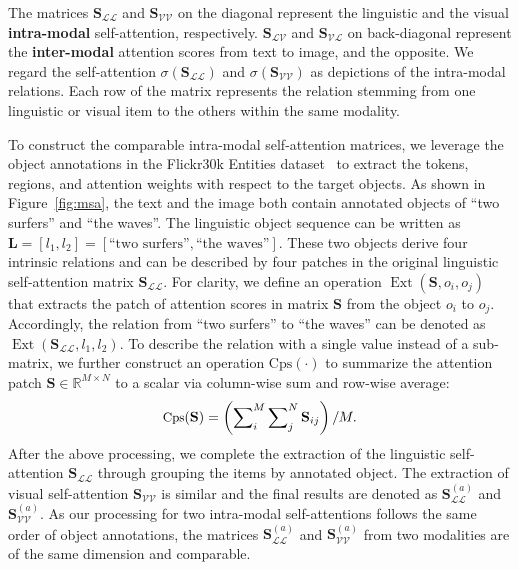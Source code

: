 \documentclass[11pt,a4paper]{article}
\begin{document}
The matrices $\mathbf{S}_{\mathcal{LL}}$ and $\mathbf{S}_{\mathcal{VV}}$ on the diagonal represent the linguistic and the visual \textbf{intra-modal} self-attention, respectively. 
$\mathbf{S}_{\mathcal{LV}}$ and $\mathbf{S}_{\mathcal{VL}}$ on back-diagonal represent the \textbf{inter-modal} attention scores from text to image, and the opposite.
We regard the self-attention $\sigma\left(\mathbf{S}_{\mathcal{LL}}\right)$ and $\sigma\left(\mathbf{S}_{\mathcal{VV}}\right)$ as depictions of the intra-modal relations. Each row of the matrix represents the relation stemming from one linguistic or visual item to the others within the same modality. 

To construct the comparable intra-modal self-attention matrices, we leverage the object annotations in the Flickr30k Entities dataset~\cite{Flickr30k-Entities} to extract the tokens, regions, and attention weights with respect to the target objects. 
As shown in Figure~\ref{fig:msa}, the text and the image both contain annotated objects of ``two surfers'' and ``the waves''.
The linguistic object sequence can be written as $\mathbf{L}=\left[l_1,l_2 \right]=\left[\text{``two surfers''}, \text{``the waves''}\right]$. 
These two objects derive four intrinsic relations and can be described by four patches in the original linguistic self-attention matrix $\mathbf{S}_{\mathcal{LL}}$.
For clarity, we define an operation $\operatorname{Ext}(\mathbf{S}, o_i, o_j)$ that extracts the patch of attention scores in matrix $\mathbf{S}$ from the object $o_i$ to $o_j$. 
Accordingly, the relation from ``two surfers'' to ``the waves'' can be denoted as $\operatorname{Ext}\left( \mathbf{S}_\mathcal{LL}, l_1, l_2 \right)$. 
To describe the relation with a single value instead of a sub-matrix, we further construct an operation $\text{Cps}(\cdot)$ to summarize the attention patch $\mathbf{S}\in \mathbb{R}^{M\times N}$ to a scalar via column-wise sum and row-wise average:
\begin{equation}
\small
    \text{Cps}(\mathbf{S}) = \left( \sum\nolimits_i^M \sum\nolimits_j^N \mathbf{S}_{ij} \right) / M.
    \label{equ:cps}
\end{equation}
After the above processing, we complete the extraction of the linguistic self-attention $\mathbf{S}_{\mathcal{LL}}$ through grouping the items by annotated object.  
The extraction of visual self-attention $\mathbf{S}_{\mathcal{VV}}$ is similar and the final results are denoted as $\mathbf{S}_{\mathcal{LL}}^{(a)}$ and $\mathbf{S}_{\mathcal{VV}}^{(a)}$.
As our processing for two intra-modal self-attentions follows the same order of object annotations, the matrices $\mathbf{S}_{\mathcal{LL}}^{(a)}$ and $\mathbf{S}_{\mathcal{VV}}^{(a)}$ from two modalities are of the same dimension and comparable.
\end{document}
